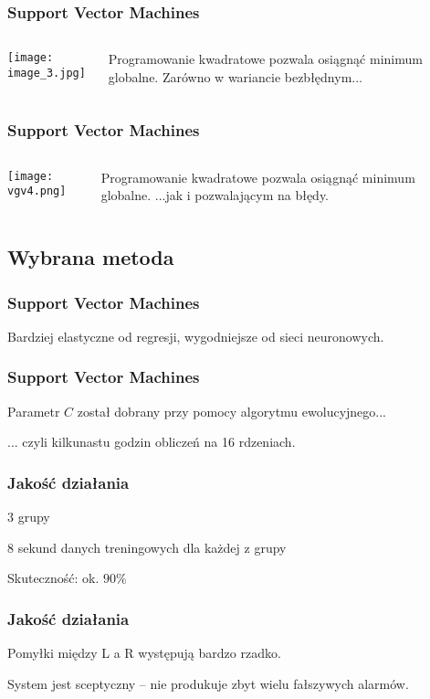 \documentclass{beamer}
\begin{document}
\begin{frame} \frametitle{Support Vector Machines}
\begin{columns}
\begin{column}{5cm}
\texttt{[image: image\_3.jpg]}
\end{column}
\begin{column}{5cm}
Programowanie kwadratowe pozwala osiągnąć minimum globalne.
Zarówno w wariancie bezbłędnym...
\end{column} 
\end{columns}
\end{frame}

\begin{frame} \frametitle{Support Vector Machines}
\begin{columns}
\begin{column}{5cm}
\texttt{[image: vgv4.png]}
\end{column}
\begin{column}{5cm}
Programowanie kwadratowe pozwala osiągnąć minimum globalne.
...jak i pozwalającym na błędy.
\end{column} 
\end{columns}
\end{frame}

\subsection{Wybrana metoda}

\begin{frame} \frametitle{Support Vector Machines}
Bardziej elastyczne od regresji, wygodniejsze od sieci neuronowych.
\end{frame}

\begin{frame} \frametitle{Support Vector Machines}
Parametr $C$ został dobrany przy pomocy algorytmu ewolucyjnego...

\pause ... czyli kilkunastu godzin obliczeń na 16 rdzeniach.
\end{frame}

\begin{frame} \frametitle{Jakość działania}
$3$ grupy

$8$ sekund danych treningowych dla każdej z grupy

Skuteczność: ok. $90\%$
\end{frame}


\begin{frame} \frametitle{Jakość działania}
Pomyłki między L a R występują bardzo rzadko.

System jest sceptyczny -- nie produkuje zbyt wielu fałszywych alarmów.
\end{frame}
\end{document}
